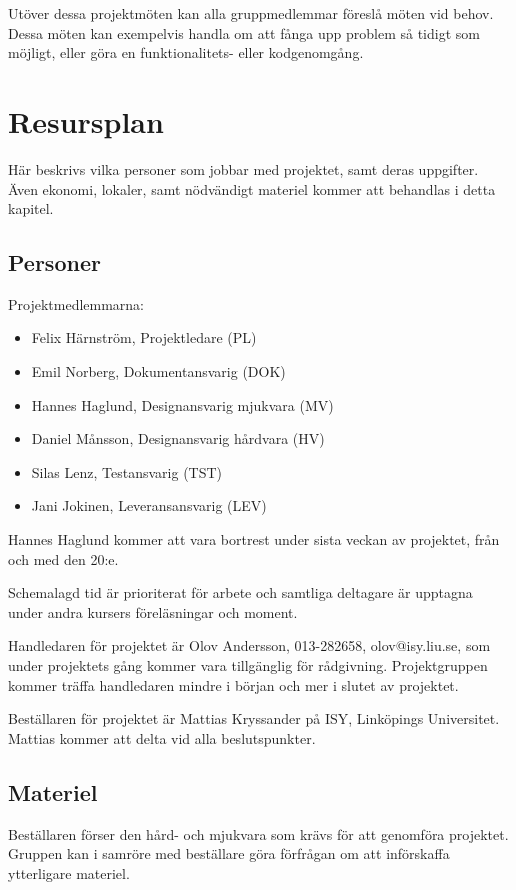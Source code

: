 \documentclass[a4paper,11pt]{article}
\makeatletter
\newcommand{\LIPShandledare}{Olov Andersson, 013-282658, olov@isy.liu.se}
\makeatother
\begin{document}
Utöver dessa projektmöten kan alla gruppmedlemmar föreslå möten vid behov. Dessa möten kan exempelvis handla om att fånga upp problem så tidigt som möjligt, eller göra en funktionalitets- eller kodgenomgång.

\section{Resursplan}
Här beskrivs vilka personer som jobbar med projektet, samt deras uppgifter. Även ekonomi, lokaler, samt nödvändigt materiel kommer att behandlas i detta kapitel.

\subsection{Personer}
Projektmedlemmarna:
\begin{itemize}
	\item Felix Härnström, Projektledare (PL)
	\item Emil Norberg, Dokumentansvarig (DOK)
	\item Hannes Haglund, Designansvarig mjukvara (MV)
	\item Daniel Månsson, Designansvarig hårdvara (HV)
	\item Silas Lenz, Testansvarig (TST)
	\item Jani Jokinen, Leveransansvarig (LEV)
\end{itemize}
Hannes Haglund kommer att vara bortrest under sista veckan av projektet, från och med den 20:e.

Schemalagd tid är prioriterat för arbete och samtliga deltagare är upptagna under andra kursers föreläsningar och moment.

Handledaren för projektet är \LIPShandledare , som under projektets gång kommer vara tillgänglig för rådgivning. Projektgruppen kommer träffa handledaren mindre i början och mer i slutet av projektet.

Beställaren för projektet är  Mattias Kryssander på ISY, Linköpings Universitet. Mattias kommer att delta vid alla beslutspunkter.

\subsection{Materiel}
Beställaren förser den hård- och mjukvara som krävs för att genomföra projektet. Gruppen kan i samröre med beställare göra förfrågan om att införskaffa ytterligare materiel. 
\end{document}
